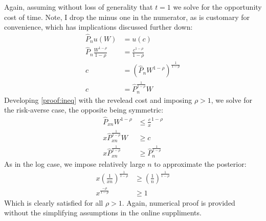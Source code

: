 \documentclass[a4paper,12pt]{article}
\begin{document}
\begin{appendices}
Again, assuming without loss of generality that $t = 1$ we solve for the opportunity cost of time. Note, I drop the minus one in the numerator, as is customary for convenience, which has implications discussed further down:
\begin{align*}
  \hat{P}_n u(W) &= u(c) \\
  \hat{P}_n  \frac{W^{1 - \rho}}{1 - \rho} &= \frac{c^{1 - \rho}}{1 - \rho} \\
  c &= \left( \hat{P}_n W^{1 - \rho} \right)^{\frac{1}{1 - \rho}} \\
  c &= \hat{P}_n^{\frac{1}{1 - \rho}} W
\end{align*}
%
Developing \ref{proof:ineq} with the revelead cost and imposing $\rho > 1$, we solve for the risk-averse case, the opposite being symmetric:
\begin{align*}
  \hat{P}_{xn}  W^{1 - \rho} &\leq \frac{c}{x}^{1 - \rho} \\
  x \hat{P}_{xn}^{\frac{1}{1 - \rho}}  W &\geq c \\
  x \hat{P}_{xn}^{\frac{1}{1 - \rho}}  &\geq \hat{P}_n^{\frac{1}{1 - \rho}}
\end{align*}
As in the log case, we impose relatively large $n$ to approximate the posterior:
\begin{align*}
  x \left( \frac{1}{xn} \right)^{\frac{1}{1 - \rho}}  &\geq \left( \frac{1}{n} \right)^{\frac{1}{1 - \rho}} \\
  x^{\frac{ - \rho}{1 - \rho}}  &\geq 1
\end{align*}
Which is clearly satisfied for all $\rho > 1$. Again, numerical proof is provided without the simplifying assumptions in the online suppliments.



\end{appendices}
\end{document}
